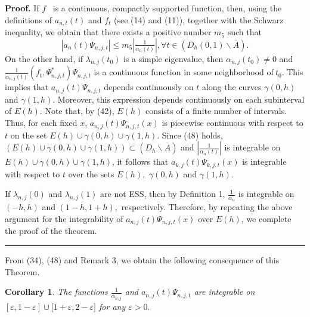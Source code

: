 \documentclass{article}%
\newtheorem{corollary}{Corollary}
\newenvironment{proof}[1][Proof]{\textbf{#1.} }{\ \rule{0.5em}{0.5em}}
\begin{document}
\begin{proof}
If $f$ \ is a continuous, compactly supported function, then, using the
definitions of $a_{n,t}(t)$ and $f_{t}$ (see (14) and (11)), together with the
Schwarz inequality, we obtain that there exists a positive number $m_{5}$ such
that
\begin{equation}
\left\vert a_{n}(t)\Psi_{n,j,t}\right\vert \leq m_{5}\left\vert \tfrac
{1}{\alpha_{n}(t)}\right\vert ,\forall t\in\left(  D_{h}(0,1)\backslash
\overline{A}\right)  . \tag{48}%
\end{equation}
On the other hand, if $\lambda_{n,j}(t_{0})$ is a simple eigenvalue, then
$\alpha_{n,j}(t_{0})\neq0$ and $\frac{1}{\alpha_{n,j}(t)}(f_{t},\Psi
_{n,j,t}^{\ast})\Psi_{n,j,t}$ is a continuous function in some neighborhood
of$\ t_{0}$. This implies that $a_{n,j}(t)\Psi_{n,j,t}$ depends continuously
on $t$ along the curves $\gamma(0,h)$ and $\gamma(1,h).$ Moreover, this
expression depends continuously on each subinterval of $E(h).$ Note that, by
(42), $E(h)$ consists of a finite number of intervals. Thus, for each fixed
$x$, $a_{n,j}(t)\Psi_{n,j,t}(x)$ is piecewise continuous with respect to $t$
on the set $E(h)\cup\gamma(0,h)\cup\gamma(1,h).$ Since (48) holds, $\left(
E(h)\cup\gamma(0,h)\cup\gamma(1,h)\right)  \subset\left(  D_{h}\backslash
\overline{A}\right)  $ and $\left\vert \tfrac{1}{\alpha_{n}(t)}\right\vert $
is integrable on $E(h)\cup\gamma(0,h)\cup\gamma(1,h)$, it follows that
$a_{k,j}(t)\Psi_{k,j,t}(x)$ is integrable with respect to $t$ over the sets
$E(h),$ $\gamma(0,h)$ and $\gamma(1,h).$

If $\lambda_{n,j}(0)$ and $\lambda_{n,j}(1)$ are not ESS, then by Definition
1, $\tfrac{1}{\alpha_{n}}$ is integrable on $(-h,h)$ and $(1-h,1+h),$
respectively. Therefore, by repeating the above argument for the integrability
of $a_{n,j}(t)\Psi_{n,j,t}(x)$ over $E(h)$, we complete the proof of the theorem.
\end{proof}

From (34), (48) and Remark 3, we obtain the following consequence of this Theorem.

\begin{corollary}
The functions $\frac{1}{\alpha_{n,j}}$ and $a_{n,j}(t)\Psi_{n,j,t}$ are
integrable on $[\varepsilon,1-\varepsilon]\cup\lbrack1+\varepsilon
,2-\varepsilon]$ for any $\varepsilon>0.$
\end{corollary}
\end{document}
